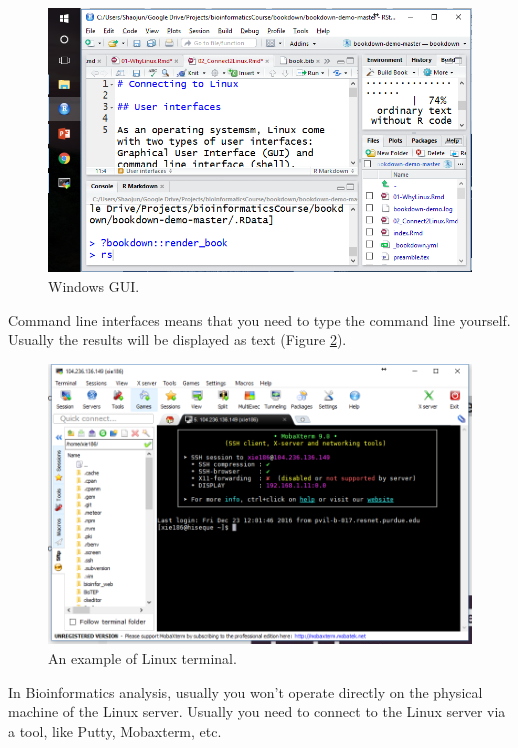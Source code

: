 \documentclass[]{book}
\begin{document}
\begin{figure}
\centering
\includegraphics{figures/windows_gui.png}
\caption{\label{fig:windowsGUI}Windows GUI.}
\end{figure}

Command line interfaces means that you need to type the command line yourself. Usually the results will be displayed as text (Figure \ref{fig:linuxTerminalExam2}).



\begin{figure}
\centering
\includegraphics{figures/linux_terminal_exam2.png}
\caption{\label{fig:linuxTerminalExam2}An example of Linux terminal.}
\end{figure}

In Bioinformatics analysis, usually you won't operate directly on the physical machine of the Linux server. Usually you need to connect to the Linux server via a tool, like Putty, Mobaxterm, etc.
\end{document}
